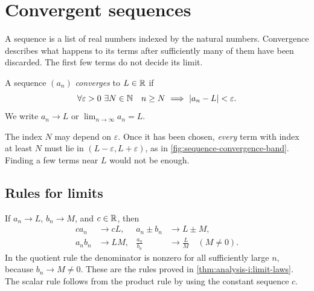 \section{Convergent sequences}
\label{sec:analysis-i:convergent-sequences}

A sequence is a list of real numbers indexed by the natural numbers.
Convergence describes what happens to its terms after sufficiently many
of them have been discarded. The first few terms do not decide its limit.

\begin{definition}
  A sequence $(a_n)$ \emph{converges} to $L\in\mathbb{R}$ if
  \[
    \forall\varepsilon>0\ \exists N\in\mathbb{N}\quad
    n\ge N\ \Longrightarrow\ |a_n-L|<\varepsilon.
  \]
  We write $a_n\to L$ or $\lim_{n\to\infty}a_n=L$.
\end{definition}

The index $N$ may depend on $\varepsilon$. Once it has been chosen,
\emph{every} term with index at least $N$ must lie in
$(L-\varepsilon,L+\varepsilon)$, as in
\autoref{fig:sequence-convergence-band}. Finding a few terms near $L$
would not be enough.

\begin{marginfigure}
  \centering
  
  \caption[An epsilon band for a convergent sequence.]{For $a_n=1+(-1)^n/n$, all terms from $N=4$ onward lie in
    the band $1-0.3<a_n<1+0.3$. A smaller band may require a later $N$.}
  \label{fig:sequence-convergence-band}
\end{marginfigure}

\subsection{Rules for limits}

If $a_n\to L$, $b_n\to M$, and $c\in\mathbb{R}$, then
\begin{align*}
  ca_n&\to cL, & a_n\pm b_n&\to L\pm M,\\
  a_nb_n&\to LM, & \frac{a_n}{b_n}&\to\frac{L}{M}\quad(M\ne0).
\end{align*}
In the quotient rule the denominator is nonzero for all sufficiently
large $n$, because $b_n\to M\ne0$. These are the rules proved in
\autoref{thm:analysis-i:limit-laws}. The scalar rule follows from the
product rule by using the constant sequence $c$.

